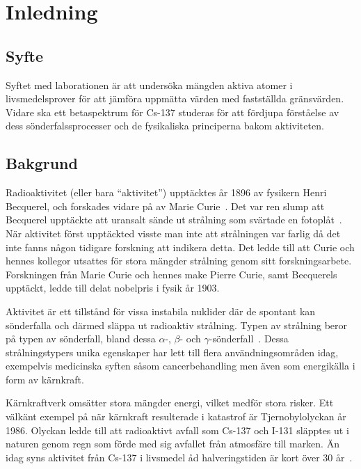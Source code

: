 \section{Inledning} \label{sec:introduction}

\subsection{Syfte} \label{sec:purpose}

Syftet med laborationen är att undersöka mängden aktiva atomer i
livsmedelsprover för att jämföra uppmätta värden med fastställda gränsvärden.
Vidare ska ett betaspektrum för Cs-137 studeras för att fördjupa förståelse
av dess sönderfalssprocesser och de fysikaliska principerna bakom aktiviteten.

\subsection{Bakgrund} \label{sec:background}

Radioaktivitet (eller bara ``aktivitet'') upptäcktes år 1896 av fysikern
Henri Becquerel, och forskades vidare på av Marie Curie~\cite{curie}. Det
var ren slump att Becquerel upptäckte att uransalt sände ut strålning som
svärtade en fotoplåt~\cite{milestones}. När aktivitet först upptäckted
visste man inte att strålningen var farlig då det inte fanns någon tidigare
forskning att indikera detta. Det ledde till att Curie och hennes kollegor
utsattes för stora mängder strålning genom sitt forskningsarbete. Forskningen
från Marie Curie och hennes make Pierre Curie, samt Becquerels upptäckt, ledde
till delat nobelpris i fysik år 1903.

Aktivitet är ett tillstånd för vissa instabila nuklider där de spontant kan
sönderfalla och därmed släppa ut radioaktiv strålning. Typen av strålning beror
på typen av sönderfall, bland dessa $\alpha$-, $\beta$- och
$\gamma$-sönderfall~\cite{arpansa}. Dessa strålningstypers unika egenskaper har
lett till flera användningsområden idag, exempelvis medicinska syften såsom
cancerbehandling men även som energikälla i form av kärnkraft.

Kärnkraftverk omsätter stora mängder energi, vilket medför stora risker. Ett
välkänt exempel på när kärnkraft resulterade i katastrof är Tjernobylolyckan år
1986. Olyckan ledde till att radioaktivt avfall som Cs-137 och I-131 släpptes
ut i naturen genom regn som förde med sig avfallet från atmosfäre till marken.
Än idag syns aktivitet från Cs-137 i livsmedel åd halveringstiden är kort
över 30 år~\cite{fysika}.

